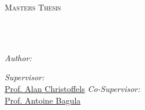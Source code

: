 \documentclass[
11pt, %
english, %
onehalfspacing, %
headsepline, %
]{MastersDoctoralThesis} %
\author{Eugene \textsc{de Beste}} %
\begin{document}
\frontmatter %

\pagestyle{plain} %


\begin{titlepage}
\begin{center}

\vspace*{.06\textheight}
{\scshape\LARGE \univname\par}\vspace{1cm} %
\textsc{\Large Masters Thesis}\\[0.5cm] %

\HRule \\[0.4cm] %
{\huge \bfseries \ttitle\par}\vspace{0.4cm} %
\HRule \\[1cm] %
 
\begin{minipage}[t]{0.4\textwidth}
\begin{flushleft} \large
\emph{Author:}\\
\href{https://themeanti.me}{\authorname} %
\end{flushleft}
\end{minipage}
\begin{minipage}[t]{0.4\textwidth}
\begin{flushright} \large
\emph{Supervisor:} \\
\href{https://christoffelslab.sanbi.ac.za/}{Prof. Alan Christoffels} %
\emph{Co-Supervisor:} \\
\href{https://www.uwc.ac.za/Biography/Pages/Prof.-Antoine-Bagula-.aspx}{Prof. Antoine Bagula} %
\end{flushright}
\end{minipage}\\[2cm]
 
\vfill


\end{center}
\end{titlepage}
\end{document}
